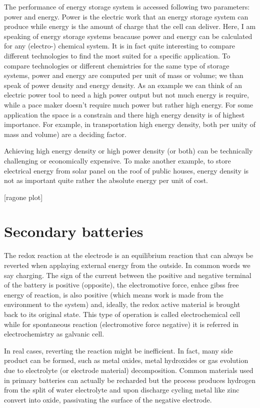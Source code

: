 The performance of energy storage system is accessed following two parameters: power and energy.
Power is the electric work that an energy storage system can produce while energy is the amount of charge that the cell can deliver. Here, I am speaking of energy storage systems beacause power and energy can be calculated for any (electro-) chemical system. It is in fact quite interesting to compare different technologies to find the most suited for a specific application. To compare technologies or different chemistries for the same type of storage systems, power and energy are computed per unit of mass or volume; we than speak of power density and energy density. As an example we can think of an electric power tool to need a high power output but not much energy is require, while a pace maker doesn't require much power but rather high energy. For some application the space is a constrain and there high energy density is of highest importance. For example, in transportation high energy density, both per unity of mass and volume) are a deciding factor.

Achieving high energy density or high power density (or both) can be technically challenging or economically expensive. To make another example, to store electrical energy from solar panel on the roof of public houses, energy density is not as important quite rather the absolute energy per unit of cost.

[ragone plot]

\section{Secondary batteries}

The redox reaction at the electrode is an equilibrium reaction that can always be reverted when applaying external energy from the outside. In common words we say charging. The sign of the current between the positive and negative terminal of the battery is positive (opposite), the electromotive force, enhce gibss free energy of reaction, is also positive (which means work is made from the environment to the system) and, ideally, the redox active material is brought back to its original state. This type of operation is called electrochemical cell while for spontaneous reaction (electromotive force negative) it is referred in electrochemistry as galvanic cell.

In real cases, reverting the reaction might be inefficient. In fact, many side product can be formed, such as metal oxides, metal hydroxides or gas evolution due to electrolyte (or electrode material) decomposition. Common materials used in primary batteries can actually be recharded but the process produces hydrogen from the split of water electrolyte and upon discharge cycling metal like zinc convert into oxide, passivating the surface of the negative electrode.

